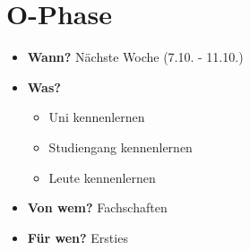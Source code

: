 \section{O-Phase}
\begin{frame}
    \slidehead
    \begin{itemize}
        \item \textbf{Wann?} Nächste Woche (7.10. - 11.10.)
        \item \textbf{Was?}\begin{itemize}
                  \item Uni kennenlernen
                  \item Studiengang kennenlernen
                  \item Leute kennenlernen
              \end{itemize}
        \item \textbf{Von wem?} Fachschaften
        \item \textbf{Für wen?} Ersties
    \end{itemize}
\end{frame}
